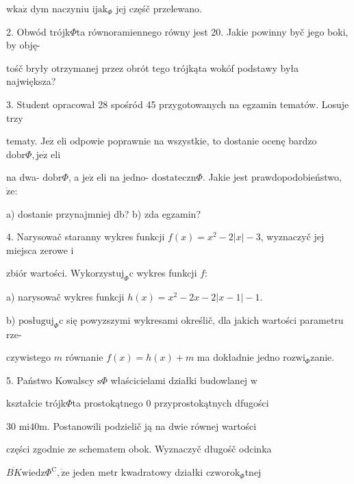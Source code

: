 \documentclass[a4paper,12pt]{article}
\begin{document}
$\mathrm{w}\mathrm{k}\mathrm{a}\dot{\mathrm{z}}$ dym naczyniu $\mathrm{i}\mathrm{j}\mathrm{a}\mathrm{k}_{\Phi}$ jej częśč przelewano.

2. Obwód trójk$\Phi$ta równoramiennego równy jest 20. Jakie powinny byč jego boki, by obję-

tośč bryły otrzymanej przez obrót tego trójkąta wokóf podstawy była największa?

3. Student opracował 28 spośród 45 przygotowanych na egzamin tematów. Losuje trzy

tematy. $\mathrm{J}\mathrm{e}\dot{\mathrm{z}}$ eli odpowie poprawnie na wszystkie, to dostanie ocenę bardzo $\mathrm{d}\mathrm{o}\mathrm{b}\mathrm{r}\Phi, \mathrm{j}\mathrm{e}\dot{\mathrm{z}}$ eli

na dwa- $\mathrm{d}\mathrm{o}\mathrm{b}\mathrm{r}\Phi$, a $\mathrm{j}\mathrm{e}\dot{\mathrm{z}}$ eli na jedno- $\mathrm{d}\mathrm{o}\mathrm{s}\mathrm{t}\mathrm{a}\mathrm{t}\mathrm{e}\mathrm{c}\mathrm{z}\mathrm{n}\Phi$. Jakie jest prawdopodobieństwo, $\dot{\mathrm{z}}\mathrm{e}$:

a) dostanie przynajmniej db? b) zda egzamin?

4. Narysowač staranny wykres funkcji $f(x)=x^{2}-2|x|-3$, wyznaczyč jej miejsca zerowe $\mathrm{i}$

zbiór wartości. $\mathrm{W}\mathrm{y}\mathrm{k}\mathrm{o}\mathrm{r}\mathrm{z}\mathrm{y}\mathrm{s}\mathrm{t}\mathrm{u}\mathrm{j}_{\Phi}\mathrm{c}$ wykres funkcji $f$:

a) narysowač wykres funkcji $h(x)=x^{2}-2x-2|x-1|-1.$

b) $\mathrm{p}\mathrm{o}\mathrm{s}\text{ł} \mathrm{u}\mathrm{g}\mathrm{u}\mathrm{j}_{\Phi}\mathrm{c}$ się powyzszymi wykresami określič, dla jakich wartości parametru rze-

czywistego $m$ równanie $f(x)=h(x)+m$ ma dokładnie jedno $\mathrm{r}\mathrm{o}\mathrm{z}\mathrm{w}\mathrm{i}_{\Phi}$zanie.

5. Państwo Kowalscy $\mathrm{s}\Phi$ właścicielami działki budowlanej $\mathrm{w}$

kształcie trójk$\Phi$ta prostokątnego $0$ przyprostokątnych dfugości

30 $\mathrm{m}\mathrm{i}40\mathrm{m}$. Postanowili podzielič ją na dwie równej wartości

części zgodnie ze schematem obok. Wyznaczyč długośč odcinka

$\overline{BK}\mathrm{w}\mathrm{i}\mathrm{e}\mathrm{d}\mathrm{z}\Phi^{\mathrm{C}}, \dot{\mathrm{z}}\mathrm{e}$ jeden metr kwadratowy działki $\mathrm{c}\mathrm{z}\mathrm{w}\mathrm{o}\mathrm{r}\mathrm{o}\mathrm{k}_{\Phi}$tnej
\end{document}
